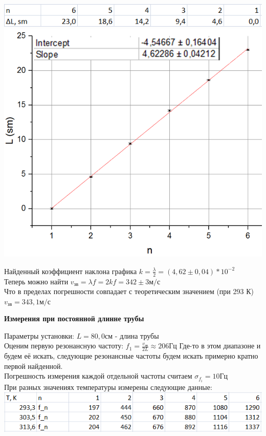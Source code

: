 \documentclass[12pt]{article}
\begin{document}
    \begin{center}
    	\includegraphics[width=14cm]{table0.png}
    	\includegraphics[width=14cm]{graph0.png}
    \end{center}
    Найденный коэффициент наклона графика $k= \frac{\lambda}{2}= (4,62 \pm 0,04) * 10^{-2}$\\
    Теперь можно найти $v_{зв} = \lambda f = 2kf = 342 \pm 3 м/с$\\
    Что в пределах погрешности совпадает с теоретическим значением (при 293 К) $v_{зв} = 343,1 м/с$
    
    
    \pagebreak
    \textbf{Измерения при постоянной длинне трубы}
    
    Параметры установки: $L = 80,0 см$ - длина трубы\\
    Оценим первую резонансную частоту: $f_1 = \frac{v_{зв}}{2L} \approx 206 Гц$ Где-то в этом диапазоне и будем её искать, следующие резонансные частоты будем искать примерно кратно первой найденной.\\
    Погрешность измерения каждой отдельной частоты считаем $\sigma_{f_i} = 10 Гц$\\
    При разных значениях температуры измерены следующие данные:\\
    \includegraphics[width=14cm]{table1.png}\\
    \\
    
\end{document}

